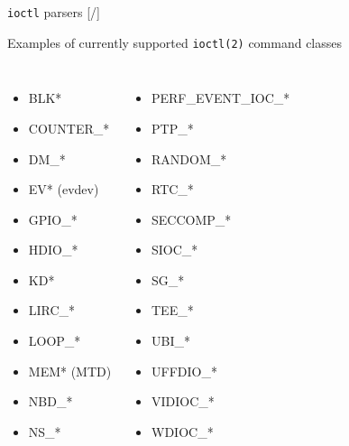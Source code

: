 \documentclass[unicode,aspectratio=169,xcolor={table,dvipsnames,usernames}]{beamer}
\begin{document}
\begin{frame}[fragile]{\texttt{ioctl} parsers \hfill [\insertframenumber/\inserttotalframenumber]}
\begin{block}{\large Examples of currently supported \texttt{ioctl(2)} command classes}
\begin{columns}
	\column{6cm}
		\begin{itemize}
			\item BLK*
			\item COUNTER\_*
			\item DM\_*
			\item EV* (evdev)
			\item GPIO\_*
			\item HDIO\_*
			\item KD*
			\item LIRC\_*
			\item LOOP\_*
			\item MEM* (MTD)
			\item NBD\_*
			\item NS\_*
		\end{itemize}
	\column{6cm}
		\begin{itemize}
			\item PERF\_EVENT\_IOC\_*
			\item PTP\_*
			\item RANDOM\_*
			\item RTC\_*
			\item SECCOMP\_*
			\item SIOC\_*
			\item SG\_*
			\item TEE\_*
			\item UBI\_*
			\item UFFDIO\_*
			\item VIDIOC\_*
			\item WDIOC\_*
		\end{itemize}
\end{columns}
\end{block}
\end{frame}
\end{document}
